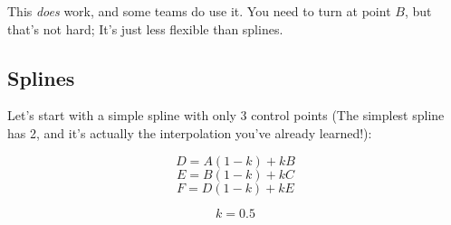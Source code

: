 \documentclass[12pt, english]{article}
\begin{document}
\par
This \textit{does} work, and some teams do use it. You need to turn at point $B$, but that's not hard; It's just less flexible than splines.
\pagebreak

\subsection{Splines}
\par
Let's start with a simple spline with only 3 control points (The simplest spline has 2, and it's actually the interpolation you've already learned!):

\begin{center}
\end{center}

\[ D = A(1-k) + kB \]
\[ E = B(1-k) + kC \]
\[ F = D(1-k) + kE \]

\[ k = 0.5 \]
\end{document}
